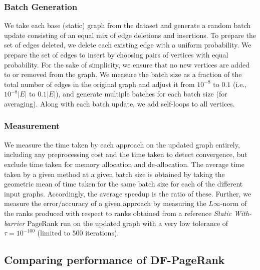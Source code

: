 


\subsubsection{Batch Generation}
\label{sec:batch-generation}

We take each base (static) graph from the dataset and generate a random batch update consisting of an equal mix of edge deletions and insertions. To prepare the set of edges deleted, we delete each existing edge with a uniform probability. We prepare the set of edges to insert by choosing pairs of vertices with equal probability. For the sake of simplicity, we ensure that no new vertices are added to or removed from the graph. We measure the batch size as a fraction of the total number of edges in the original graph and adjust it from $10^{-8}$ to $0.1$ (i.e., $10^{-8}|E|$ to $0.1|E|$), and generate multiple batches for each batch size (for averaging). Along with each batch update, we add self-loops to all vertices.


\subsubsection{Measurement}
\label{sec:measurement}

We measure the time taken by each approach on the updated graph entirely, including any preprocessing cost and the time taken to detect convergence, but exclude time taken for memory allocation and de-allocation. The average time taken by a given method at a given batch size is obtained by taking the geometric mean of time taken for the same batch size for each of the different input graphs. Accordingly, the average speedup is the ratio of these. Further, we measure the error/accuracy of a given approach by measuring the $L\infty$-norm of the ranks produced with respect to ranks obtained from a reference \textit{Static With-barrier} PageRank run on the updated graph with a very low tolerance of $\tau = 10^{-100}$ (limited to $500$ iterations).




\subsection{Comparing performance of DF-PageRank}

